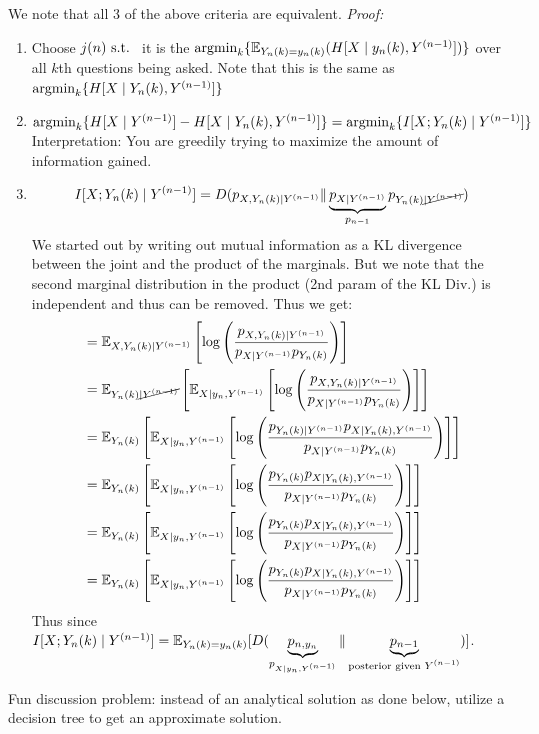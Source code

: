 We note that all 3 of the above criteria are equivalent. \textit{Proof:}
\begin{enumerate}
    \item Choose $j(n)\text{ s.t. }$ it is the $\textnormal{argmin}_k\{\mathbb{E}_{Y_n(k) = y_n(k)}(H[X\mid y_n(k), Y^{(n-1)}])\}$ over all $k$th questions being asked.
    Note that this is the same as 
    $\textnormal{argmin}_k\{H[X\mid Y_n(k), Y^{(n-1)}]\}$
    \item $\textnormal{argmin}_k\{H[X\mid Y^{(n-1)}] - H[X\mid Y_n(k), Y^{(n-1)}]\}=\textnormal{argmin}_k\{I[X; Y_n(k)\mid Y^{(n-1)}]\}$
    Interpretation: You are greedily trying to maximize the amount of information gained.
    \item $$
    I[X; Y_n(k)\mid Y^{(n-1)}] 
    = D(p_{X, Y_n(k)\mid Y^{(n-1)}} \| \underbrace{p_{X\mid Y^{(n-1)}}}_{p_{n-1}} p_{Y_n(k)\cancel{\mid Y^{(n-1)}}})
    $$
    We started out by writing out mutual information as a KL divergence between the joint and the product of the marginals. But we note that the second marginal distribution in the product (2nd param of the KL Div.) is independent and thus can be removed. Thus we get:
    \begin{align*}
    &= \mathbb{E}_{X, Y_n(k)\mid Y^{(n-1)}}\left[\log\left(\frac{p_{X, Y_n(k)\mid Y^{(n-1)}}}{p_{X\mid Y^{(n-1)}} p_{Y_n(k)}}\right)\right]
    \\
    &= \mathbb{E}_{Y_n(k)\cancel{\mid Y^{(n-1)}}}\left[\mathbb{E}_{X\mid y_n, Y^{(n-1)}}\left[\log\left(\frac{p_{X, Y_n(k)\mid Y^{(n-1)}}}{p_{X\mid Y^{(n-1)}} p_{Y_n(k)}}\right)
    \right]
    \right]
    \\
    &= \mathbb{E}_{Y_n(k)}\left[\mathbb{E}_{X\mid y_n, Y^{(n-1)}}\left[\log\left(
    \frac{
        p_{Y_n(k)\mid Y^{(n-1)}}
        p_{X\mid Y_n(k), Y^{(n-1)}}
    }{p_{X\mid Y^{(n-1)}} p_{Y_n(k)}}\right)
    \right]
    \right]
    \\
    &= \mathbb{E}_{Y_n(k)}\left[\mathbb{E}_{X\mid y_n, Y^{(n-1)}}\left[\log\left(
    \frac{
        p_{Y_n(k)}
        p_{X\mid Y_n(k), Y^{(n-1)}}
    }{p_{X\mid Y^{(n-1)}} p_{Y_n(k)}}\right)
    \right]
    \right]
    \\
    &= \mathbb{E}_{Y_n(k)}\left[\mathbb{E}_{X\mid y_n, Y^{(n-1)}}\left[\log\left(
    \frac{
        p_{Y_n(k)}
        p_{X\mid Y_n(k), Y^{(n-1)}}
    }{p_{X\mid Y^{(n-1)}} p_{Y_n(k)}}\right)
    \right]
    \right]
    \\
    &= \mathbb{E}_{Y_n(k)}\left[\mathbb{E}_{X\mid y_n, Y^{(n-1)}}\left[\log\left(
    \frac{
        p_{Y_n(k)}
        p_{X\mid Y_n(k), Y^{(n-1)}}
    }{p_{X\mid Y^{(n-1)}} p_{Y_n(k)}}\right)
    \right]
    \right]
    \end{align*}
    Thus since $I[X; Y_n(k)\mid Y^{(n-1)}] = \mathbb{E}_{Y_n(k) = y_n(k)}[D(\underbrace{p_{n, y_n}}_{p_{X\mid y_n, Y^{(n-1)}}} \| \underbrace{p_{n-1}}_{\text{posterior given $Y^{(n-1)}$}})]$.
\end{enumerate}
Fun discussion problem: instead of an analytical solution as done below, utilize a decision tree to get an approximate solution.

